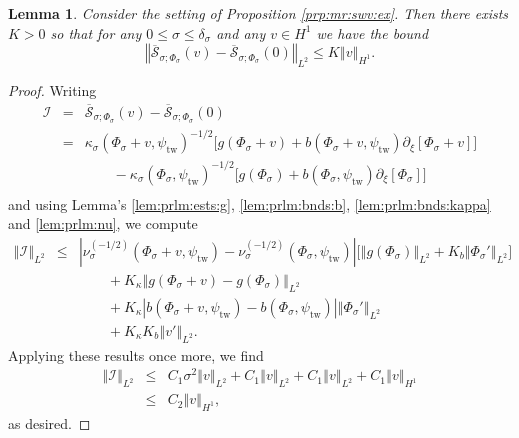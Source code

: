 \documentclass[10pt]{articleHJ}
\newcommand{\abs}[1]{\left\vert#1\right\vert}			%
\newcommand{\norm}[1]{\left\Vert#1\right\Vert}		%
\newtheorem{lem}[thm]{Lemma}
\numberwithin{equation}{section}
\begin{document}
\begin{lem}
\label{lem:fnl:lip:s:sigma}
Consider the setting
of Proposition \ref{prp:mr:swv:ex}.
Then there exists $K > 0$
so that for any
$0 \le \sigma \le \delta_{\sigma}$
and any
$v \in H^1$
we have the bound
\begin{equation}
\norm{
  \overline{\mathcal{S}}_{\sigma;\Phi_{\sigma}}(v)
  -
  \overline{\mathcal{S}}_{\sigma;\Phi_{\sigma}}(0)
}_{L^2}
\le
K \norm{v}_{H^1}.
\end{equation}
\end{lem}
\begin{proof}
Writing
\begin{equation}
\begin{array}{lcl}
\mathcal{I}
 & = & \overline{\mathcal{S}}_{\sigma;\Phi_{\sigma}}(v)
  -
  \overline{\mathcal{S}}_{\sigma;\Phi_{\sigma}}(0)
\\[0.2cm]
 & = &
    \kappa_{\sigma}(\Phi_{\sigma} + v , \psi_{\mathrm{tw}})^{-1/2}
  \Big[
     g( \Phi_{\sigma} + v )
     + b( \Phi_{\sigma} + v , \psi_{\mathrm{tw}})
        \partial_\xi [ \Phi_{\sigma} + v ]
  \Big]
\\[0.2cm]
& & \qquad
  -  \kappa_{\sigma}(\Phi_{\sigma}  , \psi_{\mathrm{tw}})^{-1/2}
  \Big[
     g( \Phi_{\sigma}  )
     + b( \Phi_{\sigma}  , \psi_{\mathrm{tw}})
        \partial_\xi [ \Phi_{\sigma}  ]
  \Big]
\\[0.2cm]

\end{array}
\end{equation}
and using
Lemma's
\ref{lem:prlm:ests:g},
\ref{lem:prlm:bnds:b},
\ref{lem:prlm:bnds:kappa}
and \ref{lem:prlm:nu},
we compute
\begin{equation}
\begin{array}{lcl}
\norm{\mathcal{I}
}_{L^2}
& \le &
\abs{\nu_{\sigma}^{(-1/2)}
  (\Phi_{\sigma} + v , \psi_{\mathrm{tw}})
- \nu_{\sigma}^{(-1/2)}(\Phi_\sigma,
   \psi_{\mathrm{tw}} )}
\big[
  \norm{g(\Phi_{\sigma} ) }_{L^2}
  + K_b \norm{\Phi_{\sigma}'  }_{L^2}
\big]
\\[0.2cm]
& & \qquad
+ K_{\kappa}
  \norm{g(\Phi_{\sigma} + v) -
    g(\Phi_\sigma) }_{L^2}
\\[0.2cm]
& & \qquad
+ K_{\kappa}
  \abs{b(\Phi_{\sigma} + v, \psi_{\mathrm{tw}})
     - b(\Phi_{\sigma} , \psi_{\mathrm{tw}}) }
  \norm{ \Phi_{\sigma}' }_{L^2}
\\[0.2cm]
& & \qquad
+ K_{\kappa} K_b \norm{v'}_{L^2}.
\end{array}
\end{equation}
Applying these results once more,
we find
\begin{equation}
\begin{array}{lcl}
\norm{\mathcal{I}
}_{L^2}
& \le &
C_1 \sigma^2
\norm{v}_{L^2}
+ C_1
  \norm{v}_{L^2}
+ C_1
    \norm{v}_{L^2}
+ C_1 \norm{v}_{H^1}
\\[0.2cm]
& \le &
C_2 \norm{v}_{H^1} ,
\end{array}
\end{equation}
as desired.
\end{proof}
\end{document}

